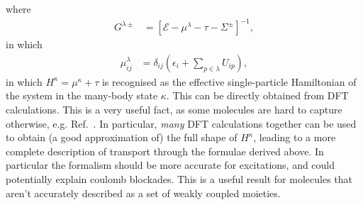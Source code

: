 where 
\begin{align*}
G^{\lambda\pm} &= \left[\mathscr{E} - \mu^\lambda - \tau - \Sigma^\pm \right]^{-1},
\end{align*}
in which
\begin{align}
\mu^\lambda_{ij} &= \delta_{ij} \left( \epsilon_i + \sum_{p\in\lambda} U_{ip} \right) \label{eq:result},
\end{align} in which $H^\kappa = \mu^\kappa + \tau$ is recognised as the effective single-particle Hamiltonian of the system in the many-body state $\kappa$. This can be directly obtained from DFT calculations. This is a very useful fact, as some molecules are hard to capture otherwise, e.g. Ref.~\cite{frisenda}. In particular, \emph{many} DFT calculations together can be used to obtain (a good approximation of) the full shape of $H^\kappa$, leading to a more complete description of transport through the formulae derived above. In particular the formalism should be more accurate for excitations, and could potentially explain coulomb blockades. This is a useful result for molecules that aren't accurately described as a set of weakly coupled moieties.

